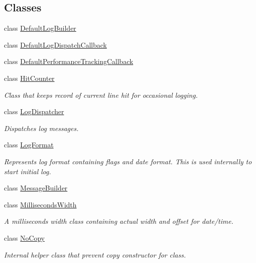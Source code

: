 \subsection*{Classes}
\begin{DoxyCompactItemize}
\item 
class \hyperlink{classel_1_1base_1_1DefaultLogBuilder}{Default\+Log\+Builder}
\item 
class \hyperlink{classel_1_1base_1_1DefaultLogDispatchCallback}{Default\+Log\+Dispatch\+Callback}
\item 
class \hyperlink{classel_1_1base_1_1DefaultPerformanceTrackingCallback}{Default\+Performance\+Tracking\+Callback}
\item 
class \hyperlink{classel_1_1base_1_1HitCounter}{Hit\+Counter}
\begin{DoxyCompactList}\small\item\em Class that keeps record of current line hit for occasional logging. \end{DoxyCompactList}\item 
class \hyperlink{classel_1_1base_1_1LogDispatcher}{Log\+Dispatcher}
\begin{DoxyCompactList}\small\item\em Dispatches log messages. \end{DoxyCompactList}\item 
class \hyperlink{classel_1_1base_1_1LogFormat}{Log\+Format}
\begin{DoxyCompactList}\small\item\em Represents log format containing flags and date format. This is used internally to start initial log. \end{DoxyCompactList}\item 
class \hyperlink{classel_1_1base_1_1MessageBuilder}{Message\+Builder}
\item 
class \hyperlink{classel_1_1base_1_1MillisecondsWidth}{Milliseconds\+Width}
\begin{DoxyCompactList}\small\item\em A milliseconds width class containing actual width and offset for date/time. \end{DoxyCompactList}\item 
class \hyperlink{classel_1_1base_1_1NoCopy}{No\+Copy}
\begin{DoxyCompactList}\small\item\em Internal helper class that prevent copy constructor for class. \end{DoxyCompactList}\item 

\end{DoxyCompactItemize}

